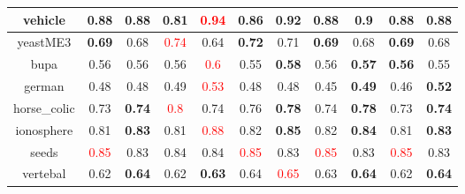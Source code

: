 \documentclass{article}%
\begin{document}
\begin{tabular}{c|cccccccccc}
\hline%
vehicle&0.88&0.88&0.81&\textcolor{red}{ 
0.94
}&0.86&\textbf{0.92}&0.88&\textbf{0.9}&0.88&0.88\\%
\hline%
yeastME3&\textbf{0.69}&0.68&\textcolor{red}{ 
0.74
}&0.64&\textbf{0.72}&0.71&\textbf{0.69}&0.68&\textbf{0.69}&0.68\\%
\hline%
bupa&0.56&0.56&0.56&\textcolor{red}{ 
0.6
}&0.55&\textbf{0.58}&0.56&\textbf{0.57}&\textbf{0.56}&0.55\\%
\hline%
german&0.48&0.48&0.49&\textcolor{red}{ 
0.53
}&0.48&0.48&0.45&\textbf{0.49}&0.46&\textbf{0.52}\\%
\hline%
horse\_colic&0.73&\textbf{0.74}&\textcolor{red}{ 
0.8
}&0.74&0.76&\textbf{0.78}&0.74&\textbf{0.78}&0.73&\textbf{0.74}\\%
\hline%
ionosphere&0.81&\textbf{0.83}&0.81&\textcolor{red}{ 
0.88
}&0.82&\textbf{0.85}&0.82&\textbf{0.84}&0.81&\textbf{0.83}\\%
\hline%
seeds&\textcolor{red}{ 
0.85
}&0.83&0.84&0.84&\textcolor{red}{ 
0.85
}&0.83&\textcolor{red}{ 
0.85
}&0.83&\textcolor{red}{ 
0.85
}&0.83\\%
\hline%
vertebal&0.62&\textbf{0.64}&0.62&\textbf{0.63}&0.64&\textcolor{red}{ 
0.65
}&0.63&\textbf{0.64}&0.62&\textbf{0.64}\\%
\hline%
\end{tabular}

%
\end{document}
